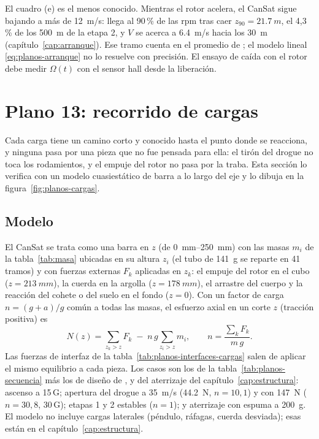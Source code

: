 \begin{nota}
El cuadro (e) es el menos conocido. Mientras el rotor acelera, el CanSat sigue bajando a
más de \SI{12}{m/s}: llega al 90\,\% de las rpm tras caer $z_{90}=\SI{21.7}{m}$, el
4,3\,\% de los \SI{500}{m} de la etapa 2, y $V$ se acerca a \SI{6.4}{m/s} hacia los
\SI{30}{m} (capítulo~\ref{cap:arranque}). Ese tramo cuenta en el promedio de ; el
modelo lineal \eqref{eq:planos-arranque} no lo resuelve con precisión. El ensayo de caída con el rotor
debe medir $\Omega(t)$ con el sensor hall desde la liberación.
\end{nota}

\section{Plano 13: recorrido de cargas}\label{sec:planos-cargas}

Cada carga tiene un camino corto y conocido hasta el punto donde se reacciona, y ninguna
pasa por una pieza que no fue pensada para ella: el tirón del drogue no toca los
rodamientos, y el empuje del rotor no pasa por la traba. Esta sección lo verifica con un
modelo cuasiestático de barra a lo largo del eje y lo dibuja en la
figura~\ref{fig:planos-cargas}.

\subsection{Modelo}
El CanSat se trata como una barra en $z$ (de \SIrange{0}{250}{mm}) con las masas $m_i$ de
la tabla~\ref{tab:masa} ubicadas en su altura $z_i$ (el tubo de \SI{141}{g} se reparte en
41 tramos) y con fuerzas externas $F_k$ aplicadas en $z_k$: el empuje del rotor en el cubo
($z=\SI{213}{mm}$), la cuerda en la argolla ($z=\SI{178}{mm}$), el arrastre del cuerpo y
la reacción del cohete o del suelo en el fondo ($z=0$). Con un factor de carga
$n=(g+a)/g$ común a todas las masas, el esfuerzo axial en un corte $z$ (tracción
positiva) es
\begin{equation}
  N(z)=\sum_{z_k>z}F_k\;-\;n\,g\sum_{z_i>z}m_i ,
  \qquad n=\frac{\sum_k F_k}{m\,g}.
  \label{eq:planos-axial}
\end{equation}
Las fuerzas de interfaz de la tabla~\ref{tab:planos-interfaces-cargas} salen de aplicar
el mismo equilibrio a cada pieza. Los casos son los de la
tabla~\ref{tab:planos-secuencia} más los de diseño de ,  y del
aterrizaje del capítulo~\ref{cap:estructura}:
ascenso a 15\,G; apertura del drogue a \SI{35}{m/s} (\SI{44.2}{N}, $n=10{,}1$) y con
\SI{147}{N} ($n=30{,}8$, 30\,G); etapas 1 y 2 estables ($n=1$); y aterrizaje con
espuma a \SI{200}{g}. El modelo no incluye cargas laterales (péndulo, ráfagas, cuerda
desviada); esas están en el capítulo~\ref{cap:estructura}.

